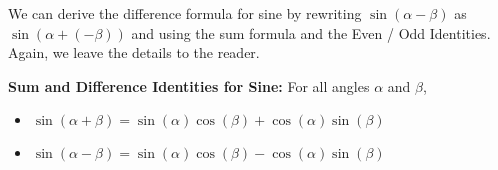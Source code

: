 We can derive the difference formula for sine by rewriting  $\sin(\alpha - \beta)$ as $\sin(\alpha + (-\beta))$ and using the sum formula and the Even / Odd Identities. Again, we leave the details to the reader.

\medskip

\colorbox{ResultColor}{\bbm

\begin{thm} \label{sinesumdifference}  \textbf{Sum and Difference Identities for Sine:} For all angles $\alpha$ and $\beta$,  

\begin{itemize}

\item  $\sin(\alpha + \beta) = \sin(\alpha) \cos(\beta) + \cos(\alpha) \sin(\beta)$

\item $\sin(\alpha - \beta) = \sin(\alpha) \cos(\beta) - \cos(\alpha) \sin(\beta)$

\end{itemize}

\end{thm}

\ebm}

\medskip



